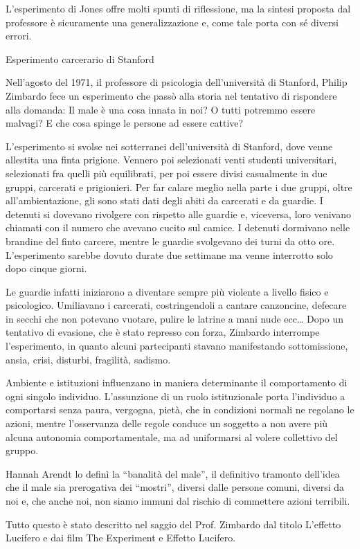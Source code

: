 \documentclass[12pt]{book} %
\begin{document}
\begin{mdframed}[linewidth=1pt]
L'esperimento di Jones offre molti spunti di riflessione, ma la sintesi proposta dal professore è
sicuramente una generalizzazione e, come tale porta con sé diversi
errori.


\bigskip

Esperimento carcerario di Stanford 

Nell'agosto del 1971, il professore di psicologia dell'università di Stanford,
Philip Zimbardo fece un esperimento che passò alla storia nel tentativo di rispondere alla domanda: Il male è una cosa
innata in noi? O tutti potremmo essere malvagi? E che cosa spinge le persone ad essere cattive?

L'esperimento si svolse nei sotterranei dell'università di Stanford, dove
venne allestita una finta prigione. Vennero poi selezionati venti studenti universitari, selezionati fra quelli più
equilibrati, per poi essere divisi casualmente in due gruppi, carcerati e prigionieri. Per far calare meglio nella
parte i due gruppi, oltre all'ambientazione, gli sono stati dati degli abiti da carcerati e da
guardie. I detenuti si dovevano rivolgere con rispetto alle guardie e, viceversa, loro venivano chiamati con il numero
che avevano cucito sul camice. I detenuti dormivano nelle brandine del finto carcere, mentre le guardie svolgevano dei
turni da otto ore. L'esperimento sarebbe dovuto durate due settimane ma venne interrotto solo dopo
cinque giorni.

Le guardie infatti iniziarono a diventare sempre più violente a livello fisico e psicologico. Umiliavano i carcerati,
costringendoli a cantare canzoncine, defecare in secchi che non potevano vuotare, pulire le latrine a mani nude ecc…
Dopo un tentativo di evasione, che è stato represso con forza, Zimbardo interrompe l'esperimento,
in quanto alcuni partecipanti stavano manifestando sottomissione, ansia, crisi, disturbi, fragilità, sadismo.

Ambiente e istituzioni influenzano in maniera determinante il comportamento di ogni singolo individuo.
L'assunzione di un ruolo istituzionale porta l'individuo a comportarsi senza
paura, vergogna, pietà, che in condizioni normali ne regolano le azioni, mentre l'osservanza delle
regole conduce un soggetto a non avere più alcuna autonomia comportamentale, ma ad uniformarsi al volere collettivo del
gruppo.

Hannah Arendt lo definì la “banalità del male”, il definitivo tramonto dell'idea che il male sia
prerogativa dei “mostri”, diversi dalle persone comuni, diversi da noi e, che anche noi, non siamo immuni dal rischio
di commettere azioni terribili.

Tutto questo è stato descritto nel saggio del Prof. Zimbardo dal titolo L'effetto Lucifero e dai
film The Experiment e Effetto
Lucifero.
\end{mdframed}
\end{document}
